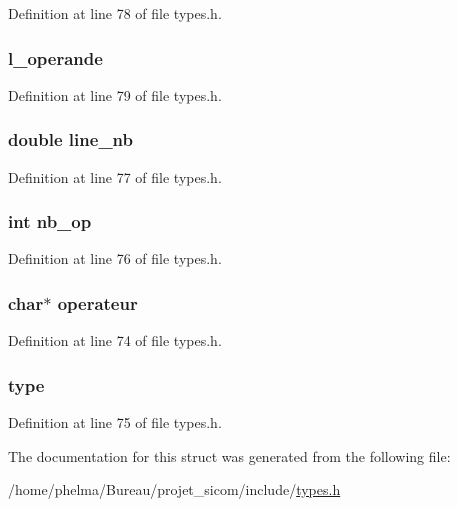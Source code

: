 Definition at line 78 of file types.\-h.

\hypertarget{struct__text___acdac487d99d10dba873a0f07707b220f}{
\subsubsection[{l\-\_\-operande}]{ l\-\_\-operande}}\label{struct__text___acdac487d99d10dba873a0f07707b220f}


Definition at line 79 of file types.\-h.

\hypertarget{struct__text___a808a37180ef5a21555b2f0f68cf73cb6}{
\subsubsection[{line\-\_\-nb}]{\setlength{\rightskip}{0pt plus 5cm}double line\-\_\-nb}}\label{struct__text___a808a37180ef5a21555b2f0f68cf73cb6}


Definition at line 77 of file types.\-h.

\hypertarget{struct__text___a88a29c0db6a919d126d1c94d573dd711}{
\subsubsection[{nb\-\_\-op}]{\setlength{\rightskip}{0pt plus 5cm}int nb\-\_\-op}}\label{struct__text___a88a29c0db6a919d126d1c94d573dd711}


Definition at line 76 of file types.\-h.

\hypertarget{struct__text___adc2a267b945f31e8e0dad4b528128cab}{
\subsubsection[{operateur}]{\setlength{\rightskip}{0pt plus 5cm}char$\ast$ operateur}}\label{struct__text___adc2a267b945f31e8e0dad4b528128cab}


Definition at line 74 of file types.\-h.

\hypertarget{struct__text___a92c69ddff0b8be636cead81c5b73f667}{
\subsubsection[{type}]{ type}}\label{struct__text___a92c69ddff0b8be636cead81c5b73f667}


Definition at line 75 of file types.\-h.



The documentation for this struct was generated from the following file\-:\begin{DoxyCompactItemize}
\item 
/home/phelma/\-Bureau/projet\-\_\-sicom/include/\hyperlink{types_8h}{types.\-h}\end{DoxyCompactItemize}
